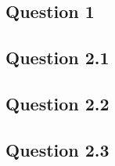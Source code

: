\subsection{Question 1}

\subsection{Question 2.1}

\subsection{Question 2.2}

\subsection{Question 2.3}
